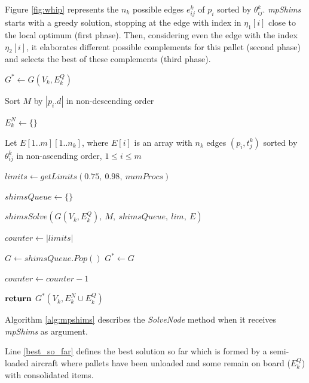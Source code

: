 \documentclass[preprint,authoryear]{elsarticle}
\begin{document}
Figure \ref{fig:whip} represents the $n_k$\/ possible edges $e_{ij}^k$\/ of $p_i$\/ sorted by $\theta_{ij}^k$. \emph{mpShims}\/ starts with a greedy solution, stopping at the edge with index in $\eta_1[i]$ close to the local optimum (first phase). Then, considering even the edge with the index $\eta_2[i]$, it elaborates different possible complements for this pallet (second phase) and selects the best of these complements (third phase).


\begin{algorithm}[H]
	\caption{ $SolveNode(mpShims, k, G, numProcs)$}  \label{alg:mpshims}
	\begin{algorithmic}[1]
		
		\State $G^* \gets G(V_k, E^Q_k)$ \label{best_so_far}
		
		\State Sort $M$ by $|p_i.d|$ in non-descending order \label{mpshims:pallets}
		
		\State $E^N_k \gets \{\}$ \label{mpshims:items}
		
		\State Let $E[1..m][1..n_k]$, where $E[i]$ is an array with $n_k$ edges $(p_i,t^k_j)$ sorted by $\theta_{ij}^k$ in non-ascending order, $1 \leq i \leq m$ \label{mpshims:edges}
		
		\State $limits \gets getLimits(0.75,\ 0.98,\ numProcs)$ \label{mpshims:limits}
		
		\State $shimsQueue \gets \{\}$ \label{mpshims:queue}
	
			\State $shimsSolve(G(V_k, E^Q_k),\ M,\ shimsQueue,\ lim,\ E)$ \label{mpshims:send}
		\EndFor
		
		\State $counter \gets |limits|$
		

			\State $G \gets shimsQueue.Pop()$	\label{mpshims:wait}
				\State $G^* \gets G$ 
			\EndIf
			
			\State $counter \gets counter - 1$
		
		\EndWhile		
		
		\State ${\bf return}$ $G^*(V_k, E^N_k \cup E^Q_k)$ \label{mpshims:return}
	\end{algorithmic}
\end{algorithm}

Algorithm \ref{alg:mpshims} describes the {\it SolveNode} method when it receives {\it mpShims} as argument.

Line \ref{best_so_far} defines the best solution so far which is formed by a semi-loaded aircraft where pallets have been unloaded and some remain on board ($E^Q_k$) with consolidated items.
\end{document}
